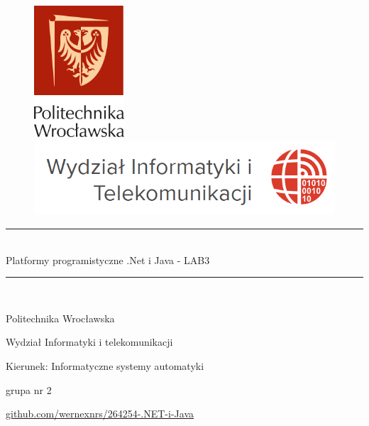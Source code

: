 \documentclass{report}
\begin{document}
	\begin{titlepage}
		\begin{figure}[h]
			\begin{minipage}[l]{.5\textwidth}%
				\includegraphics[width=0.3\textwidth]{pwr_logo}
			\end{minipage}%
			\begin{minipage}[r]{.5\textwidth}%
				\includegraphics[width=1\textwidth]{wit_logo}
			\end{minipage}%
		\end{figure}
		
		\vspace*{3mm}
		
		\begin{center}
			\rule{\textwidth}{0.8pt}\\ 
			\vspace*{6mm}
			{\LARGE Platformy programistyczne .Net i Java - LAB3}\\
			\vspace*{3mm}
			\rule{\textwidth}{0.8pt}\\
			
			\vspace{1.5cm}
			{
				Politechnika Wrocławska
				
				Wydział Informatyki i telekomunikacji
				
				Kierunek: Informatyczne systemy automatyki
				
				grupa nr 2
				
				\href{https://github.com/wernexnrs/264254-.NET-i-Java}{github.com/wernexnrs/264254-.NET-i-Java}
				
}
\end{center}
\end{titlepage}
\end{document}
